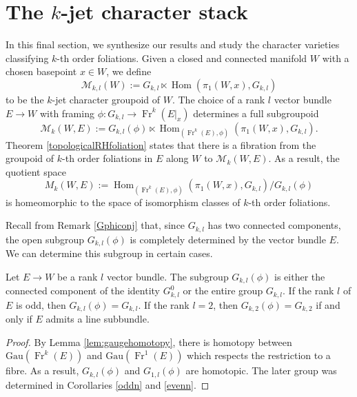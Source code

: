 \documentclass[10pt]{amsart}
\newcommand{\Hom}{\operatorname{Hom}}
\newcommand{\Fr}{{\operatorname{Fr}}}
\numberwithin{theoremalpha}{section}
\numberwithin{equation}{section}
\numberwithin{definition}{section}
\numberwithin{theorem}{section}
\numberwithin{proposition}{section}
\numberwithin{lemma}{section}
\numberwithin{example}{section}
\numberwithin{remark}{section}
\numberwithin{corollary}{section}
\numberwithin{question}{section}
\numberwithin{problem}{section}
\numberwithin{assumption}{section}
\theoremstyle{named}
\numberwithin{equation}{section}
\begin{document}
\section{The $k$-jet character stack} \label{sec:character}
In this final section, we synthesize our results and study the character varieties classifying $k$-th order foliations. Given a closed and connected manifold $W$ with a chosen basepoint $x \in W$, we define 
\[
\mathcal{M}_{k,l}(W) := G_{k,l} \ltimes \Hom(\pi_1(W, x), G_{k,l})
\]
to be the $k$-jet character groupoid of $W$. The choice of a rank $l$ vector bundle $E \to W$ with framing $\phi : G_{k,l} \to \Fr^k(E|_{x})$ determines a full subgroupoid 
\[
\mathcal{M}_{k}(W,E) := G_{k,l}(\phi) \ltimes \Hom_{(\Fr^k(E),\phi)}(\pi_1(W,x),G_{k,l}). 
\]
Theorem \ref{topologicalRHfoliation} states that there is a fibration from the groupoid of $k$-th order foliations in $E$ along $W$ to $\mathcal{M}_{k}(W,E)$. As a result, the quotient space 
\[
M_{k}(W,E) := \Hom_{(\Fr^k(E),\phi)}(\pi_1(W,x),G_{k,l})/G_{k,l}(\phi)
\]
is homeomorphic to the space of isomorphism classes of $k$-th order foliations. 

Recall from Remark \ref{Gphiconj} that, since $G_{k,l}$ has two connected components, the open subgroup $G_{k,l}(\phi)$ is completely determined by the vector bundle $E$. We can determine this subgroup in certain cases. 

\begin{lemma}
Let $E \rightarrow W$ be a rank $l$ vector bundle. The subgroup $G_{k,l}(\phi)$ is either the connected component of the identity $G_{k,l}^{0}$ or the entire group $G_{k,l}$. If the rank $l$ of $E$ is odd, then $G_{k,l}(\phi) = G_{k,l}$. If the rank $l = 2$, then $G_{k,2}(\phi) = G_{k,2}$ if and only if $E$ admits a line subbundle. 
\end{lemma}
\begin{proof}
By Lemma \ref{lem:gaugehomotopy}, there is homotopy between $\mathrm{Gau}(\Fr^k(E))$ and $\mathrm{Gau}(\Fr^1(E))$ which respects the restriction to a fibre. As a result, $G_{k,l}(\phi)$ and $G_{1,l}(\phi)$ are homotopic. The later group was determined in Corollaries \ref{oddn} and \ref{evenn}. 
\end{proof}
\end{document}
